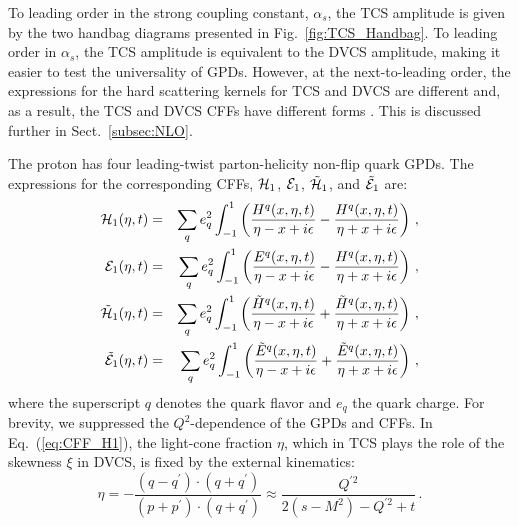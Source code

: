 To leading order in the strong coupling constant, $\alpha_s$, the TCS amplitude
is given by the two handbag diagrams presented in Fig.~\ref{fig:TCS_Handbag}.
To leading order in $\alpha_s$, the TCS amplitude is equivalent to the
DVCS amplitude, making it easier to test the universality of GPDs.
However, at the next-to-leading order, the expressions for the hard scattering
kernels for TCS and DVCS are different and, as a result, the TCS and DVCS CFFs
have different forms \cite{Pire:2011st,Pire:2012yq}. This is discussed further
in Sect.~\ref{subsec:NLO}.

The proton has four leading-twist parton-helicity non-flip quark GPDs. The
expressions for the corresponding CFFs, ${\cal H}_1$, ${\cal E}_1$,
${\tilde{\cal H}}_1$, and $\tilde{{\cal E}}_1$ are:
\begin{eqnarray}
{\cal H}_1(\eta,t) &= &\sum_q e_q^2 \int^{1}_{-1} \left(\frac{H^q (x,\eta,t)}{\eta-x+i \epsilon}
  -\frac{H^q (x,\eta,t)}{\eta+x+i \epsilon}\right) \,, \nonumber\\
{\cal E}_1(\eta,t) &= &\sum_q e_q^2 \int^{1}_{-1} \left(\frac{E^q (x,\eta,t)}{\eta-x+i \epsilon}
  -\frac{H^q (x,\eta,t)}{\eta+x+i \epsilon}\right) \,, \nonumber\\
\tilde{{\cal H}}_1(\eta,t) &= &\sum_q e_q^2 \int^{1}_{-1} \left(\frac{\tilde{H}^q (x,\eta,t)}{\eta-x+i \epsilon} +\frac{\tilde{H}^q (x,\eta,t)}{\eta+x+i \epsilon}\right) \,, \nonumber\\
\tilde{{\cal E}}_1(\eta,t) &= &\sum_q e_q^2 \int^{1}_{-1} \left(\frac{\tilde{E}^q (x,\eta,t)}{\eta-x+i \epsilon} +\frac{\tilde{E}^q (x,\eta,t)}{\eta+x+i \epsilon}\right) \,,
\label{eq:CFF_H1}
\end{eqnarray}
where the superscript $q$ denotes the quark flavor and $e_q$ the quark charge.
For brevity, we suppressed the $Q^2$-dependence of the GPDs and CFFs.
In Eq.~(\ref{eq:CFF_H1}), the light-cone fraction $\eta$, which in TCS plays
the role of the skewness $\xi$ in DVCS, is fixed by the external kinematics:
\begin{equation}
\eta=-\frac{(q-q^{\prime}) \cdot (q+q^{\prime})}{(p+p^{\prime}) \cdot (q+q^{\prime})} \approx \frac{Q^{\prime 2}}{2(s-M^2)-Q^{\prime 2}+t} \,.
\label{eq:eta}
\end{equation} 

